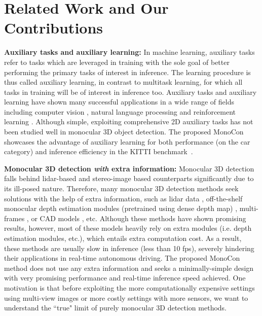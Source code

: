 \documentclass[letterpaper]{article} \usepackage{aaai22}  \usepackage{times}  \usepackage{helvet}  \usepackage{courier}  \usepackage[hyphens]{url}  \usepackage{graphicx} \urlstyle{rm} \def\UrlFont{\rm}  \usepackage{natbib}  \usepackage{caption} \DeclareCaptionStyle{ruled}{labelfont=normalfont,labelsep=colon,strut=off} \frenchspacing  \setlength{\pdfpagewidth}{8.5in}  \setlength{\pdfpageheight}{11in}  \usepackage{algorithm}
\begin{document}
\section{Related Work and Our Contributions}

\textbf{Auxiliary tasks and auxiliary learning:} In machine learning, auxiliary tasks refer to tasks which are leveraged in training with the sole goal of better performing the primary tasks of interest in inference. The learning procedure is thus called auxiliary learning, in contrast to multitask learning, for which all tasks in training will be of interest in inference too. Auxiliary tasks and auxiliary learning have shown many successful applications in a wide range of fields including computer vision \cite{au1, au2, au6, au7, au8}, natural language processing \cite{au3} and reinforcement learning \cite{au4, au5}.  Although simple, exploiting comprehensive 2D auxiliary tasks has not been studied well in monocular 3D object detection. The proposed MonoCon showcases the advantage of auxiliary learning for both performance (on the car category) and inference efficiency in the KITTI benchmark~\cite{kitti}. 

\textbf{Monocular 3D detection \textit{with} extra information:} Monocular 3D detection falls behind lidar-based and stereo-image based counterparts significantly due to its ill-posed nature. Therefore, many monocular 3D detection methods seek solutions with the help of extra information, such as lidar data \cite{monorun, caddn}, off-the-shelf monocular depth estimation modules (pretrained using dense depth map) \cite{multifusion, d4lcn, pseudolidar, patchnet, am3d, ddmp3d}, multi-frames \cite{kinematic3d}, {or CAD models \cite{3dvp, deepmanta, mono3d++}}, etc. Although these methods have shown promising results, however, most of these models heavily rely on extra modules (i.e. depth estimation modules, etc.), which entails extra computation cost. As a result, these methods are usually slow in inference (less than 10 fps), severely hindering their applications in real-time autonomous driving. The proposed MonoCon method does not use any extra information and seeks a minimally-simple design with very promising performance and real-time inference speed achieved. One motivation is that before exploiting the more computationally expensive settings using multi-view images or more costly settings with more sensors, we want to understand the ``true" limit of purely monocular 3D detection methods.
\end{document}
